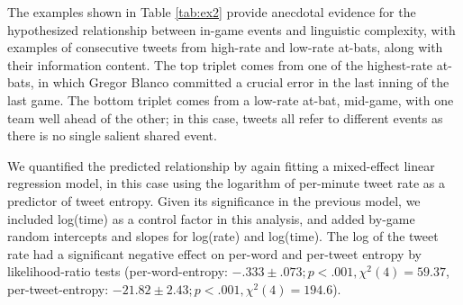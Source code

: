 \documentclass[11pt,letterpaper]{article}
\begin{document}
The examples shown in Table \ref{tab:ex2} provide anecdotal evidence for the hypothesized relationship between in-game events and linguistic complexity, with examples of consecutive tweets from high-rate and low-rate at-bats, along with their information content. The top triplet comes from one of the highest-rate at-bats, in which Gregor Blanco committed a crucial error in the last inning of the last game.  The bottom triplet comes from a low-rate at-bat, mid-game, with one team well ahead of the other; in this case, tweets all refer to different events as there is no single salient shared event.


We quantified the predicted relationship by again fitting a mixed-effect linear regression model, in this case using the logarithm of per-minute tweet rate as a predictor of tweet entropy.  Given its significance in the previous model, we included log(time) as a control factor in this analysis, and added by-game random intercepts and slopes for log(rate) and log(time).  The log of the tweet rate had a significant negative effect on per-word and per-tweet entropy by likelihood-ratio tests (per-word-entropy: $-.333 \pm .073; p<.001, \chi^2(4)=59.37$, per-tweet-entropy: $-21.82 \pm 2.43; p<.001, \chi^2(4)=194.6$). 
\end{document}
